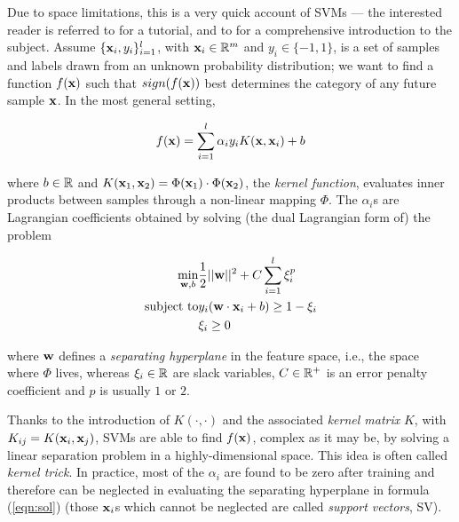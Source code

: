 Due to space limitations, this is a very quick account of SVMs --- the
interested reader is referred to \cite{Burges98} for a tutorial, and
to \cite{Cristianini00} for a comprehensive introduction to the
subject. Assume $\{\mathbf{x}_i,y_i\}_{i=1}^l$, with $\mathbf{x}_i \in \mathbb{R}^m$ and
$y_i \in \{-1,1\}$, is a set of samples and labels drawn from an
unknown probability distribution; we want to find a function $f(\mathbf{x})$
such that $sign(f(\mathbf{x}))$ best determines the category of any future
sample $\mathbf{x}$. In the most general setting,

\begin{equation} \label{eqn:sol}
  f(\mathbf{x}) = \sum_{i=1}^l \alpha_i y_i K(\mathbf{x},\mathbf{x}_i) + b
\end{equation}

\noindent where $b \in \mathbb{R}$ and $K(\mathbf{x}_1,\mathbf{x}_2) = \Phi(\mathbf{x}_1)
\cdot \Phi(\mathbf{x}_2)$, the \emph{kernel function}, evaluates inner
products between samples through a non-linear mapping $\Phi$. The
$\alpha_i$s are Lagrangian coefficients obtained by solving (the dual
Lagrangian form of) the problem

\begin{eqnarray} \label{eqn:svm_primal}
  \min_{\mathbf{w},b}      & \frac{1}{2} ||\mathbf{w}||^2 + C \sum_{i=1}^l \xi_i^p \\
  \mbox{subject to} & y_i (\mathbf{w}\cdot\mathbf{x}_i + b) \geq 1-\xi_i            \nonumber \\
                    & \xi_i \geq 0                                    \nonumber
\end{eqnarray}

\noindent where $\mathbf{w}$ defines a \emph{separating hyperplane}
in the feature space, i.e., the space where $\Phi$ lives, whereas
$\xi_i \in \mathbb{R}$ are slack variables, $C \in \mathbb{R}^+$ is an error penalty
coefficient and $p$ is usually $1$ or $2$.

Thanks to the introduction of $K(\cdot,\cdot)$ and the associated
\emph{kernel matrix} $K$, with $K_{ij} = K(\mathbf{x}_i,\mathbf{x}_j)$, SVMs are
able to find $f(\mathbf{x})$, complex as it may be, by solving a linear
separation problem in a highly-dimensional space. This idea is often
called \emph{kernel trick}. In practice, most of the $\alpha_i$ are found
to be zero after training and therefore can be neglected in evaluating the
separating hyperplane in formula (\ref{eqn:sol}) (those $\mathbf{x}_i$s which cannot
be neglected are called \emph{support vectors}, SV).
